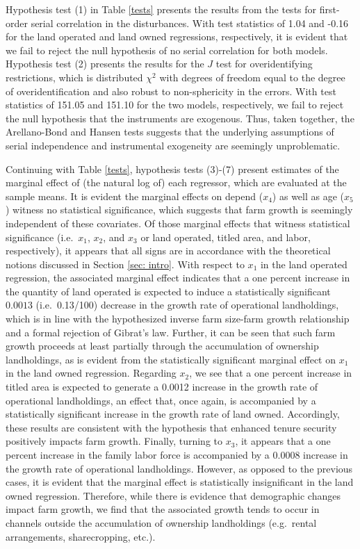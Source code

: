 \documentclass[english]{article}
\begin{document}
Hypothesis test (1) in Table \ref{tests} presents the results from the \citet{arellano1991} tests for first-order serial correlation in the disturbances. With test statistics of 1.04 and -0.16 for the land operated and land owned regressions, respectively, it is evident that we fail to reject the null hypothesis of no serial correlation for both models. Hypothesis test (2) presents the results for the \citet{hansen1982} $J$ test for overidentifying restrictions, which is distributed $\chi^2$ with degrees of freedom equal to the degree of overidentification and also robust to non-sphericity in the errors. With test statistics of 151.05 and 151.10 for the two models, respectively, we fail to reject the null hypothesis that the instruments are exogenous. Thus, taken together, the Arellano-Bond and Hansen tests suggests that the underlying assumptions of serial independence and instrumental exogeneity are seemingly unproblematic.

Continuing with Table \ref{tests}, hypothesis tests (3)-(7) present estimates of the marginal effect of (the natural log of) each regressor, which are evaluated at the sample means. It is evident the marginal effects on depend ($x_4$) as well as age ($x_5$) witness no statistical significance, which suggests that farm growth is seemingly independent of these covariates. Of those marginal effects that witness statistical significance (i.e.\ $x_1$, $x_2$, and $x_3$ or land operated, titled area, and labor, respectively), it appears that all signs are in accordance with the theoretical notions discussed in Section \ref{sec: intro}. With respect to $x_1$ in the land operated regression, the associated marginal effect indicates that a one percent increase in the quantity of land operated is expected to induce a statistically significant $0.0013$ (i.e.\ 0.13/100) decrease in the growth rate of operational landholdings, which is in line with the hypothesized inverse farm size-farm growth relationship and a formal rejection of Gibrat's law. Further, it can be seen that such farm growth proceeds at least partially through the accumulation of ownership landholdings, as is evident from the statistically significant marginal effect on $x_1$ in the land owned regression. Regarding $x_2$, we see that a one percent increase in titled area is expected to generate a 0.0012 increase in the growth rate of operational landholdings, an effect that, once again, is accompanied by a statistically significant increase in the growth rate of land owned. Accordingly, these results are consistent with the hypothesis that enhanced tenure security positively impacts farm growth. Finally, turning to $x_3$, it appears that a one percent increase in the family labor force is accompanied by a 0.0008 increase in the growth rate of operational landholdings. However, as opposed to the previous cases, it is evident that the marginal effect is statistically insignificant in the land owned regression. Therefore, while there is evidence that demographic changes impact farm growth, we find that the associated growth tends to occur in channels outside the accumulation of ownership landholdings (e.g.\ rental arrangements, sharecropping, etc.).
\end{document}
